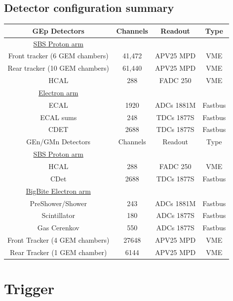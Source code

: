 \documentclass{article}
\begin{document}
\subsection{Detector configuration summary}
\begin{tabular}{|c|c|c|c|}
\hline
GEp Detectors & Channels& Readout & Type \\
\hline
\underline{SBS Proton arm} & & & \\
Front tracker (6 GEM chambers) & 41,472 & APV25 MPD& VME\\
Rear tracker (10 GEM chambers) & 61,440& APV25 MPD& VME\\
HCAL & 288 & FADC 250 &VME\\
\hline
\underline{Electron arm} & & & \\
ECAL & 1920 & ADCs 1881M &Fastbus\\
ECAL sums& 248 & TDCs 1877S &Fastbus\\
CDET & 2688 & TDCs 1877S &Fastbus \\
\hline
\hline
GEn/GMn Detectors & Channels& Readout & Type \\
\hline
\underline{SBS Proton arm} & & & \\
HCAL & 288 & FADC 250 &VME\\
CDet & 2688 & TDCs 1877S&Fastbus\\
\hline
\underline{BigBite Electron arm} & & & \\
PreShower/Shower & 243 & ADCs 1881M&Fastbus\\
Scintillator & 180& ADCs 1877S&Fastbus\\
Gas Cerenkov & 550& ADCs 1877S&Fastbus\\
Front Tracker (4 GEM chambers) & 27648 & APV25 MPD &VME\\
Rear Tracker (1 GEM chamber) & 6144& APV25 MPD &VME\\
\hline
\end{tabular}

\section{Trigger}
\end{document}
